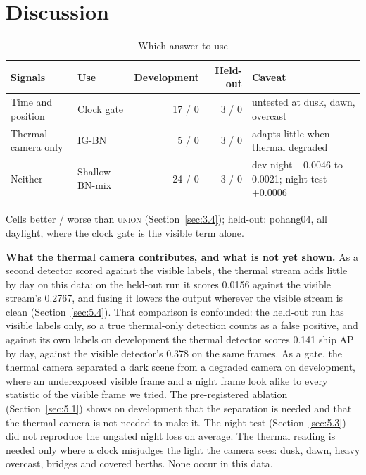 \documentclass[journal]{IEEEtran}
\begin{document}
\section{Discussion}\label{sec:7}
\begin{table}[!t]
\centering
\small
\caption{Which answer to use}
\label{tab:23}
\begin{tabularx}{\linewidth}{llrr>{\raggedright\arraybackslash}X}
\toprule
Signals & Use & Development & Held-out & Caveat \\
\midrule
Time and position & Clock gate & 17 / 0 & 3 / 0 & untested at dusk, dawn, overcast \\
Thermal camera only & \mbox{IG-BN} & 5 / 0 & 3 / 0 & adapts little when thermal degraded \\
Neither & Shallow BN-mix & 24 / 0 & 3 / 0 & dev night $-$0.0046 to $-$0.0021; night test +0.0006 \\
\bottomrule
\end{tabularx}
\par\smallskip\raggedright\footnotesize Cells better / worse than \textsc{union} (Section~\ref{sec:3.4}); held-out: pohang04, all daylight, where the clock gate is the visible term alone.
\end{table}
\textbf{What the thermal camera contributes, and what is not yet shown.} As a second detector scored against the visible labels, the thermal stream adds little by day on this data: on the held-out run it scores 0.0156 against the visible stream's 0.2767, and fusing it lowers the output wherever the visible stream is clean (Section~\ref{sec:5.4}). That comparison is confounded: the held-out run has visible labels only, so a true thermal-only detection counts as a false positive, and against its own labels on development the thermal detector scores 0.141 ship AP by day, against the visible detector's 0.378 on the same frames. As a gate, the thermal camera separated a dark scene from a degraded camera on development, where an underexposed visible frame and a night frame look alike to every statistic of the visible frame we tried. The pre-registered ablation (Section~\ref{sec:5.1}) shows on development that the separation is needed and that the thermal camera is not needed to make it. The night test (Section~\ref{sec:5.3}) did not reproduce the ungated night loss on average. The thermal reading is needed only where a clock misjudges the light the camera sees: dusk, dawn, heavy overcast, bridges and covered berths. None occur in this data.
\end{document}
